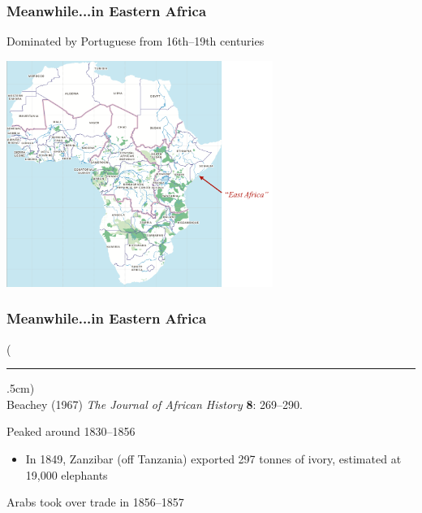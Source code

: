 \documentclass[10pt]{beamer}
\newenvironment{reference}[2]{%
	\begin{textblock*}{\textwidth}(#1,#2)
		\tiny\bgroup\color{gray}}{\egroup\end{textblock*}}
\begin{document}
\begin{frame}[t]
\frametitle{Meanwhile...in Eastern Africa}
\vspace{0.5cm}
	
	Dominated by Portuguese from 16th--19th centuries\\
	
	\medskip
	
	\begin{center}
		\includegraphics[width=0.65\textwidth]{figures/east1.png}
	\end{center}
\end{frame}


\begin{frame}[t]
\frametitle{Meanwhile...in Eastern Africa}
\vspace{0.5cm}

	\begin{reference}{4mm}{92mm}
		\rule{1.5cm}{0.25pt}\\
		Beachey (1967) \emph{The Journal of African History} \textbf{8}: 269--290.
	\end{reference}
	
	Peaked around 1830--1856\\
	
	\medskip
	
	\begin{itemize}
		\item In 1849, Zanzibar (off Tanzania) exported 297 tonnes of ivory, estimated at 19,000 elephants\\
	\end{itemize}
	
	\medskip
	Arabs took over trade in 1856--1857
\end{frame}
\end{document}
